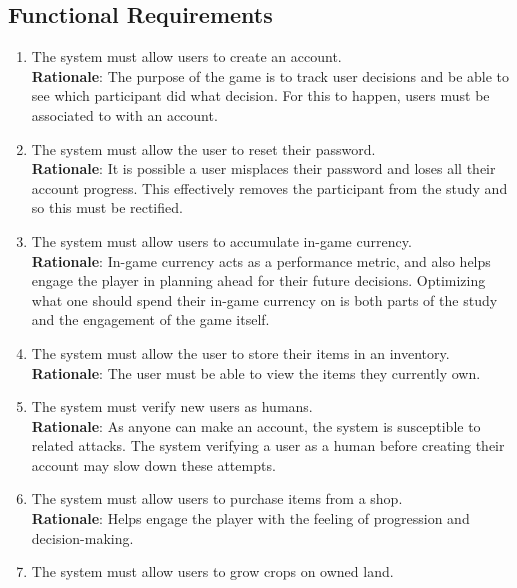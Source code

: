 \documentclass{article}
\begin{document}
\subsection{Functional Requirements}
\begin{enumerate}[{FR}1. ]
    \item \label{FR1} The system must allow users to create an account.\\
    \textbf{Rationale}: The purpose of the game is to track user decisions and be able to see which participant did what decision. For this to happen, users must be associated to with an account.
    \item \label{FR2} The system must allow the user to reset their password.\\
    \textbf{Rationale}: It is possible a user misplaces their password and loses all their account progress. This effectively removes the participant from the study and so this must be rectified.
    \item \label{FR3} The system must allow users to accumulate in-game currency.\\
    \textbf{Rationale}: In-game currency acts as a performance metric, and also helps engage the player in planning ahead for their future decisions. Optimizing what one should spend their in-game currency on is both parts of the study and the engagement of the game itself.
    \item \label{FR4} The system must allow the user to store their items in an inventory.
    \textbf{Rationale}: The user must be able to view the items they currently own.
    \item \label{FR5} The system must verify new users as humans.\\
    \textbf{Rationale}: As anyone can make an account, the system is susceptible to related attacks. The system verifying a user as a human before creating their account may slow down these attempts.
    \item \label{FR6} The system must allow users to purchase items from a shop.\\
    \textbf{Rationale}: Helps engage the player with the feeling of progression and decision-making.
    \item \label{FR7} The system must allow users to grow crops on owned land.\\

\end{enumerate}
\end{document}
